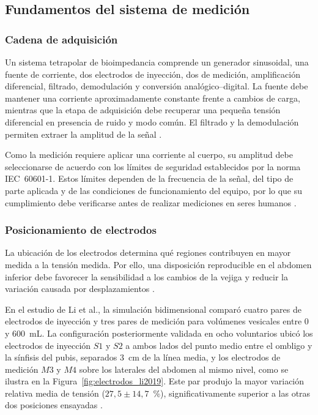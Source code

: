 \documentclass[12pt,a4paper]{article}
\begin{document}
\subsection{Fundamentos del sistema de medición}

\subsubsection{Cadena de adquisición}

Un sistema tetrapolar de bioimpedancia comprende un generador sinusoidal, una fuente de corriente, dos
electrodos de inyección, dos de medición, amplificación diferencial, filtrado, demodulación y conversión
analógico--digital. La fuente debe mantener una corriente aproximadamente constante frente a cambios de
carga, mientras que la etapa de adquisición debe recuperar una pequeña tensión diferencial en presencia
de ruido y modo común. El filtrado y la demodulación permiten extraer la amplitud de la señal \cite{alrawi2013howland}.

Como la medición requiere aplicar una corriente al cuerpo, su amplitud debe seleccionarse de acuerdo con
los límites de seguridad establecidos por la norma IEC~60601-1. Estos límites dependen de la frecuencia
de la señal, del tipo de parte aplicada y de las condiciones de funcionamiento del equipo, por lo que su
cumplimiento debe verificarse antes de realizar mediciones en seres humanos \cite{iec60601}.

\subsubsection{Posicionamiento de electrodos}

La ubicación de los electrodos determina qué regiones contribuyen en mayor medida a la tensión medida.
Por ello, una disposición reproducible en el abdomen inferior debe favorecer la sensibilidad a los
cambios de la vejiga y reducir la variación causada por desplazamientos \cite{li2019electrode}.

En el estudio de Li et al., la simulación bidimensional comparó cuatro pares de electrodos de inyección
y tres pares de medición para volúmenes vesicales entre 0 y 600~mL. La configuración posteriormente
validada en ocho voluntarios ubicó los electrodos de inyección $S1$ y $S2$ a ambos lados del punto medio
entre el ombligo y la sínfisis del pubis, separados 3~cm de la línea media, y los electrodos de medición
$M3$ y $M4$ sobre los laterales del abdomen al mismo nivel, como se ilustra en la
Figura~\ref{fig:electrodos_li2019}. Este par produjo la mayor variación relativa media de tensión
($27{,}5\pm14{,}7$~\%), significativamente superior a las otras dos posiciones ensayadas
\cite{li2019electrode}.
\end{document}
